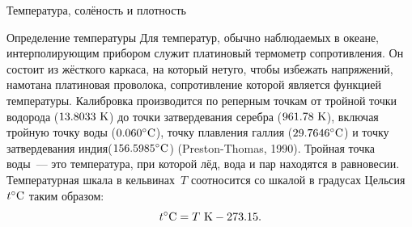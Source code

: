 \begin{chapter}{Температура, солёность и плотность}
\begin{section}{Определение температуры}
Для температур, обычно наблюдаемых в океане, интерполирующим прибором
служит платиновый термометр сопротивления. Он состоит из жёсткого каркаса,
на который нетуго, чтобы избежать напряжений, намотана платиновая проволока,
сопротивление которой
является функцией температуры. Калибровка производится по реперным точкам
от тройной точки водорода ($13.8033\mbox{~K}$) до точки затвердевания 
серебра ($961.78\mbox{~K}$), включая тройную точку воды (${0.060}^\circ\mbox{C}$), 
точку плавления галлия (${29.7646}^\circ\mbox{C}$) и точку затвердевания 
индия(${156.5985}^\circ\mbox{C}$) (Preston-Thomas, 1990). Тройная точка воды~--- 
это температура, при которой лёд, вода и пар находятся в равновесии. 
Температурная шкала в кельвинах~$T$ соотносится со шкалой в градусах 
Цельсия~${t}^\circ\mbox{C}$ таким образом:
\begin{equation}
{t}^\circ\mbox{C} = T\mbox{~K} - 273.15.
\end{equation}
%


\end{section}
\end{chapter}
